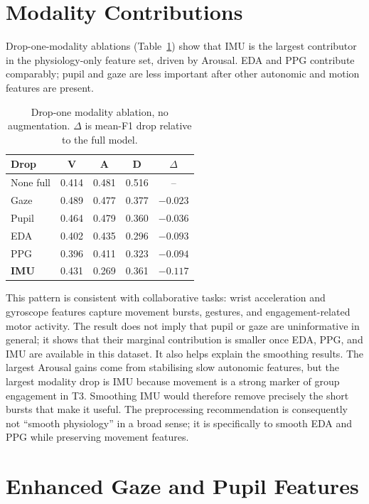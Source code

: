 \documentclass[sigconf,review,anonymous]{acmart}
\newcommand{\best}[1]{\textbf{\textcolor{bestcol}{#1}}}
\begin{document}
\section{Modality Contributions}
\label{sec:modality}

Drop-one-modality ablations (Table~\ref{tab:modality}) show that IMU is the
largest contributor in the physiology-only feature set, driven by Arousal.
EDA and PPG contribute comparably; pupil and gaze are less important after
other autonomic and motion features are present.

\begin{table}[t]
\caption{Drop-one modality ablation, no augmentation. $\Delta$ is mean-F1 drop
relative to the full model.}
\label{tab:modality}
\centering
\setlength{\tabcolsep}{4pt}
\small
\begin{tabular}{lcccc}
\toprule
\textbf{Drop} & \textbf{V} & \textbf{A} & \textbf{D} & $\Delta$ \\
\midrule
None full  & 0.414 & 0.481 & 0.516 & -- \\
Gaze       & 0.489 & 0.477 & 0.377 & $-0.023$ \\
Pupil      & 0.464 & 0.479 & 0.360 & $-0.036$ \\
EDA        & 0.402 & 0.435 & 0.296 & $-0.093$ \\
PPG        & 0.396 & 0.411 & 0.323 & $-0.094$ \\
\best{IMU} & 0.431 & 0.269 & 0.361 & $\mathbf{-0.117}$ \\
\bottomrule
\end{tabular}
\end{table}

This pattern is consistent with collaborative tasks: wrist acceleration and
gyroscope features capture movement bursts, gestures, and engagement-related
motor activity.
The result does not imply that pupil or gaze are uninformative in general; it
shows that their marginal contribution is smaller once EDA, PPG, and IMU are
available in this dataset.
It also helps explain the smoothing results.
The largest Arousal gains come from stabilising slow autonomic features, but
the largest modality drop is IMU because movement is a strong marker of group
engagement in T3.
Smoothing IMU would therefore remove precisely the short bursts that make it
useful.
The preprocessing recommendation is consequently not ``smooth physiology''
in a broad sense; it is specifically to smooth EDA and PPG while preserving
movement features.


\section{Enhanced Gaze and Pupil Features}
\label{sec:v2_features}
\end{document}
